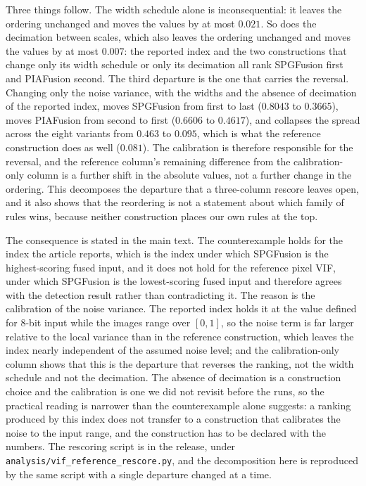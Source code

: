 \documentclass[10pt,a4paper]{article}
\begin{document}
Three things follow. The width schedule alone is inconsequential: it leaves the
ordering unchanged and moves the values by at most $0.021$. So does the decimation
between scales, which also leaves the ordering unchanged and moves the values by at
most $0.007$: the reported index and the two constructions that change only its width
schedule or only its decimation all rank SPGFusion first and PIAFusion second. The
third departure is the one that carries the reversal. Changing only the noise
variance, with the widths and the absence of decimation of the reported index, moves
SPGFusion from first to last ($0.8043$ to $0.3665$), moves PIAFusion from second to
first ($0.6606$ to $0.4617$), and collapses the spread across the eight variants from
$0.463$ to $0.095$, which is what the reference construction does as well ($0.081$).
The calibration is therefore responsible for the reversal, and the reference column's
remaining difference from the calibration-only column is a further shift in the
absolute values, not a further change in the ordering. This decomposes the departure
that a three-column rescore leaves open, and it also shows that the reordering is not
a statement about which family of rules wins, because neither construction places our
own rules at the top.

The consequence is stated in the main text. The counterexample holds for the index
the article reports, which is the index under which SPGFusion is the highest-scoring
fused input, and it does not hold for the reference pixel VIF, under which SPGFusion
is the lowest-scoring fused input and therefore agrees with the detection result
rather than contradicting it. The reason is the calibration of the noise variance. The
reported index holds it at the value defined for 8-bit input while the images range
over $[0,1]$, so the noise term is far larger relative to the local variance than in
the reference construction, which leaves the index nearly independent of the assumed
noise level; and the calibration-only column shows that this is the departure that
reverses the ranking, not the width schedule and not the decimation. The absence of
decimation is a construction choice and the calibration is one we did not revisit
before the runs, so the practical reading is narrower than the counterexample alone
suggests: a ranking produced by this index does not transfer to a construction that
calibrates the noise to the input range, and the construction has to be declared with
the numbers. The rescoring script is in the release, under
\texttt{analysis/vif\_reference\_rescore.py}, and the decomposition here is reproduced
by the same script with a single departure changed at a time.
\end{document}
